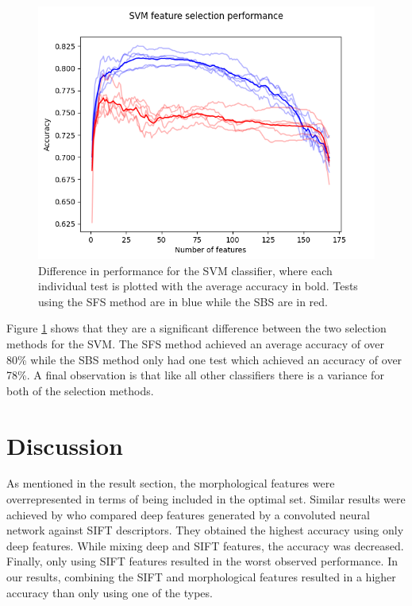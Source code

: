 \documentclass{kththesis}
\begin{document}
\begin{figure}[h!]
  \begin{center}
    \includegraphics[scale=0.8]{../new_plots/svm_graph.png}
    \caption{Difference in performance for the SVM classifier, where each individual test is plotted with the average accuracy in bold. Tests using the SFS method are in blue while the SBS are in red.}
    \label{fig:svm}
  \end{center}
\end{figure}

Figure \ref{fig:svm} shows that they are a significant difference between the two selection methods for the SVM. The SFS method achieved an average accuracy of over 80\% while the SBS method only had one test which achieved an accuracy of over 78\%. A final observation is that like all other classifiers there is a variance for both of the selection methods.


\chapter{Discussion}

As mentioned in the result section, the morphological features were overrepresented in terms of being included in the optimal set. Similar results were achieved by \parencite{Zhang}
who compared deep features generated by a convoluted neural network against SIFT descriptors. They obtained the highest accuracy using only deep features. While mixing deep and SIFT features, the accuracy was decreased. Finally, only using SIFT features resulted in the worst observed performance. In our results, combining the SIFT and morphological features resulted in a higher accuracy than only using one of the types.
\end{document}
